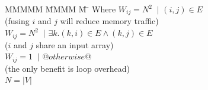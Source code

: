 \begin{tabbing}
MMMMM   \= MMMM \= M \= \kill
Where      \> $W_{ij} = N^2$ \> $~|$ \> $(i,j) \in E $         \\
           \> \> \> (fusing $i$ and $j$ will reduce memory traffic)         \\
           \> $W_{ij} = N^2$ \> $~|$ \> $\exists k. (k,i) \in E \wedge (k,j) \in E $     \\
           \> \> \> ($i$ and $j$ share an input array)                                         \\
           \> $W_{ij} = 1$   \> $~|$ \> $@otherwise@$                                                  \\
           \> \> \> (the only benefit is loop overhead)                                        
\\
           \> $N = |V|$
\end{tabbing}

% 
